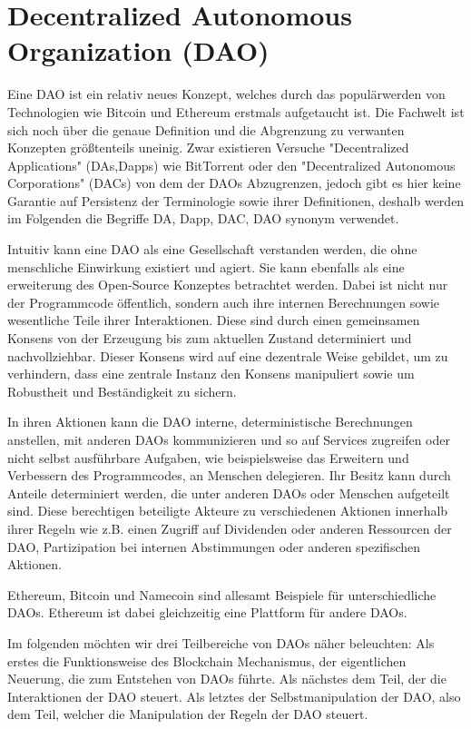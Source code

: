 \documentclass[a4paper,12pt]{report}
\begin{document}
\section{Decentralized Autonomous Organization (DAO)}
Eine DAO ist ein relativ neues Konzept, welches durch das populärwerden von Technologien wie Bitcoin und Ethereum erstmals aufgetaucht ist. Die Fachwelt ist sich noch über die genaue Definition und die Abgrenzung zu verwanten Konzepten größtenteils uneinig. Zwar existieren Versuche "Decentralized Applications" (DAs,Dapps) wie BitTorrent oder den "Decentralized Autonomous Corporations" (DACs) von dem der DAOs Abzugrenzen, jedoch gibt es hier keine Garantie auf Persistenz der Terminologie sowie ihrer Definitionen, deshalb werden im Folgenden die Begriffe DA, Dapp, DAC, DAO synonym verwendet.

Intuitiv kann eine DAO als eine Gesellschaft verstanden werden, die ohne menschliche Einwirkung existiert und agiert. Sie kann ebenfalls als eine erweiterung des Open-Source Konzeptes betrachtet werden. Dabei ist nicht nur der Programmcode öffentlich, sondern auch ihre internen Berechnungen sowie wesentliche Teile ihrer Interaktionen. Diese sind durch einen gemeinsamen Konsens von der Erzeugung bis zum aktuellen Zustand determiniert und nachvollziehbar. Dieser Konsens wird auf eine dezentrale Weise gebildet, um zu verhindern, dass eine zentrale Instanz den Konsens manipuliert sowie um Robustheit und Beständigkeit zu sichern.

In ihren Aktionen kann die DAO interne, deterministische Berechnungen anstellen, mit anderen DAOs kommunizieren und so auf Services zugreifen oder nicht selbst ausführbare Aufgaben, wie beispielsweise das Erweitern und Verbessern des Programmcodes, an Menschen delegieren. Ihr Besitz kann durch Anteile determiniert werden, die unter anderen DAOs oder Menschen aufgeteilt sind. Diese berechtigen beteiligte Akteure zu verschiedenen Aktionen innerhalb ihrer Regeln wie z.B. einen Zugriff auf Dividenden oder anderen Ressourcen der DAO, Partizipation bei internen Abstimmungen oder anderen spezifischen Aktionen. 

Ethereum, Bitcoin und Namecoin sind allesamt Beispiele für unterschiedliche DAOs. Ethereum ist dabei gleichzeitig eine Plattform für andere DAOs.

Im folgenden möchten wir drei Teilbereiche von DAOs näher beleuchten: Als erstes die Funktionsweise des Blockchain Mechanismus, der eigentlichen Neuerung, die zum Entstehen von DAOs führte. Als nächstes dem Teil, der die Interaktionen der DAO steuert. Als letztes der Selbstmanipulation der DAO, also dem Teil, welcher die Manipulation der Regeln der DAO steuert.
\end{document}
